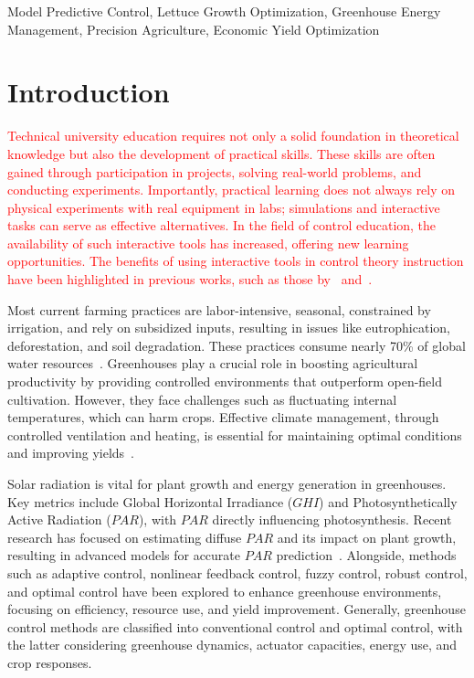 \documentclass[conference]{IEEEtran}
\begin{document}
\begin{IEEEkeywords}
    Model Predictive Control, Lettuce Growth Optimization, Greenhouse Energy Management, Precision Agriculture, Economic Yield Optimization
\end{IEEEkeywords}

\section{Introduction}
\textcolor{red}{Technical university education requires not only a solid foundation in theoretical knowledge but also the development of practical skills. These skills are often gained through participation in projects, solving real-world problems, and conducting experiments. Importantly, practical learning does not always rely on physical experiments with real equipment in labs; simulations and interactive tasks can serve as effective alternatives. In the field of control education, the availability of such interactive tools has increased, offering new learning opportunities. The benefits of using interactive tools in control theory instruction have been highlighted in previous works, such as those by~\cite{Emami1991} and~\cite{Guzman2013}.}

Most current farming practices are labor-intensive, seasonal, constrained by irrigation, and rely on subsidized inputs, resulting in issues like eutrophication, deforestation, and soil degradation. These practices consume nearly 70\% of global water resources~\cite{Debroy2024}. Greenhouses play a crucial role in boosting agricultural productivity by providing controlled environments that outperform open-field cultivation. However, they face challenges such as fluctuating internal temperatures, which can harm crops. Effective climate management, through controlled ventilation and heating, is essential for maintaining optimal conditions and improving yields~\cite{Wu2019}.

Solar radiation is vital for plant growth and energy generation in greenhouses. Key metrics include Global Horizontal Irradiance (\(GHI\)) and Photosynthetically Active Radiation (\(PAR\)), with \(PAR\) directly influencing photosynthesis. Recent research has focused on estimating diffuse \(PAR\) and its impact on plant growth, resulting in advanced models for accurate \(PAR\) prediction~\cite{Iddio2020, MaLu2022}. Alongside, methods such as adaptive control, nonlinear feedback control, fuzzy control, robust control, and optimal control have been explored to enhance greenhouse environments, focusing on efficiency, resource use, and yield improvement. Generally, greenhouse control methods are classified into conventional control and optimal control, with the latter considering greenhouse dynamics, actuator capacities, energy use, and crop responses.
\end{document}
